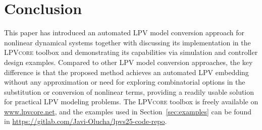 \section{Conclusion\label{sec:conclusion}}
This paper has introduced an automated LPV model conversion approach for nonlinear dynamical systems
together with discussing its implementation in the \textsc{LPVcore} toolbox and demonstrating its  capabilities via simulation and controller design examples. Compared to other LPV model conversion approaches, the key difference is that the proposed method achieves an automated LPV embedding without any approximation or need for exploring combinatorial options in the substitution or conversion of nonlinear terms, providing a readily usable solution for practical LPV modeling problems. The \textsc{LPVcore} toolbox is freely available on \url{www.lpvcore.net}, and the examples used in Section~\ref{sec:examples} can be found in \url{https://gitlab.com/Javi-Olucha/lpvs25-code-repo}.